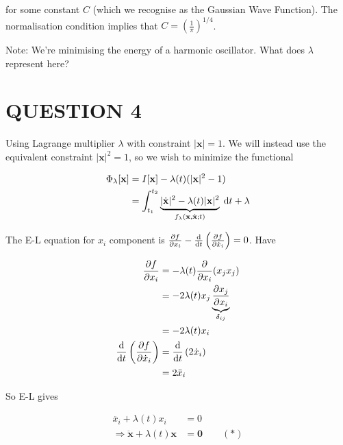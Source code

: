 \documentclass[a4paper]{article}
\begin{document}
for some constant $ C $ (which we recognise as the Gaussian Wave Function).
The normalisation condition implies that $ C = \left(  \frac{1}{\pi} \right)^{1/4}  $. 

Note: We're minimising the energy of a harmonic oscillator. What does $ \lambda $ represent here?





\section{QUESTION 4}
                                                 
Using Lagrange multiplier $ \lambda $ with constraint $ | \mathbf{x} | = 1 $. We will instead use the equivalent constraint $ | \mathbf{x} |^{2} = 1 $, so we wish to minimize the functional 
                                                 
\begin{align*}
\Phi_{\lambda}[\mathbf{x}] & = I[\mathbf{x}] - \lambda(t) (  | \mathbf{x} |^{2} - 1 ) \\
& = \int_{t_{1}}^{t_{2}} \underbrace{| \dot{\mathbf{x}} |^{2} - \lambda(t) | \mathbf{x} |^{2}}_{f_{\lambda}(\mathbf{x},\dot{\mathbf{x}} ; t )  } \; \mathrm{d} t + \lambda
\end{align*}   

The E-L equation for $ x_{i} $ component is $ \frac{\partial f }{\partial x_{i}} - \frac{\mathrm{d} }{\mathrm{d} t} \left(  \frac{\partial f}{\partial \dot{x}_{i}} \right) = 0   $. Have


\begin{align*}
\frac{\partial f }{\partial x_{i}} & = - \lambda(t) \frac{\partial }{\partial x_{i}} (x_{j}x_{j})  \\
& = - 2 \lambda(t) x_{j} \underbrace{\frac{\partial x_{j}}{\partial x_{i}}}_{\delta_{ij}} \\
& = - 2 \lambda(t) x_{i} \\
\frac{\mathrm{d} }{\mathrm{d} t} \left(  \frac{\partial f}{\partial \dot{x}_{i}} \right) & = \frac{\mathrm{d} }{\mathrm{d} t} \left( 2 \dot{x}_{i}  \right) \\
& = 2 \ddot{x}_{i}  
\end{align*}

So E-L gives

\begin{align*}
\ddot{x_{i}} + \lambda(t) x_{i} & = 0 \\
\Rightarrow  \ddot{\mathbf{x}} + \lambda(t) \mathbf{x} & = \mathbf{0}  \qquad (*)
\end{align*}    
\end{document}
